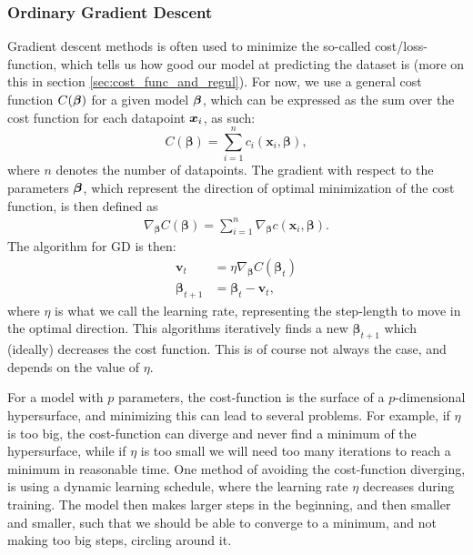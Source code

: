\documentclass[12pt]{extarticle}
\begin{document}
\subsubsection{Ordinary Gradient Descent}
Gradient descent methods is often used to minimize the so-called cost/loss-function, which tells us how good our model at predicting the dataset is (more on this in section \ref{sec:cost_func_and_regul}). For now, we use a general cost function $C(\boldsymbol{\beta})$ for a given model $\boldsymbol{\beta}$, which can be expressed as the sum over the cost function for each datapoint $\boldsymbol x_i$, as such:
\begin{equation}
	C(\boldsymbol{\beta}) = \sum_{i = 1}^{n}c_i(\mathbf{x}_i, \boldsymbol{\beta}),
\end{equation}
where $n$ denotes the number of datapoints. The gradient with respect to the parameters $\boldsymbol{\beta}$, which represent the direction of optimal minimization of the cost function,  is then defined as
\begin{align}
	\nabla_{\boldsymbol{\beta}} C(\boldsymbol{\beta}) = \sum_{i = 1}^{n} \nabla_{\boldsymbol{\beta}} c(\mathbf{x}_i, \boldsymbol{\beta}).
	\label{eq:Total_gradient}
\end{align}
The algorithm for GD is then:
\begin{align}
	\mathbf{v}_t             & = \eta \nabla_{\boldsymbol{\beta}} C(\boldsymbol{\beta}_t) \nonumber \\
	\boldsymbol{\beta}_{t+1} & = \boldsymbol{\beta}_t - \mathbf{v}_t,
	\label{eq:GD_algo}
\end{align}
where $\eta$ is what we call the learning rate, representing the step-length to move in the optimal direction.  This algorithms iteratively finds a new $\boldsymbol{\beta}_{t+1}$ which (ideally) decreases the cost function. This is of course not always the case, and depends on the value of $\eta$.

For a model with $p$ parameters, the cost-function is the surface of a $p$-dimensional hypersurface, and minimizing this can lead to several problems. For example, if $\eta$  is too big, the cost-function can diverge and never find a minimum of the hypersurface, while if $\eta$ is too small we will need too many iterations to reach a minimum in reasonable time. One method of avoiding the cost-function diverging, is using a dynamic learning schedule, where the learning rate $\eta$ decreases during training. The model then makes larger steps in the beginning, and then smaller and smaller, such that we should be able to converge to a minimum, and not making too big steps, circling around it.
\end{document}
